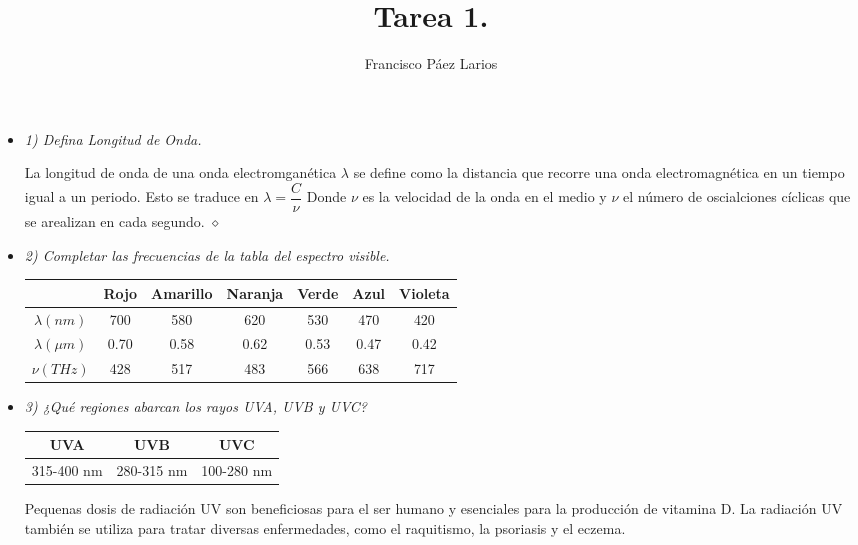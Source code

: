 \documentclass{article}
\title{Tarea 1.}
\author{Francisco Páez Larios}
\begin{document}
\maketitle
\begin{itemize}
\item \textit{1) Defina Longitud de Onda.}

La longitud de onda de una onda electromganética  $ \lambda $ se define como la distancia que recorre una onda electromagnética en un tiempo igual a un periodo. Esto se traduce en $ \lambda =\dfrac{C}{\nu} $ Donde $\nu$ es la velocidad de la onda en el medio y $\nu$  el número de oscialciones cíclicas que se arealizan en cada segundo.
$ \diamond$\\

\item \textit{2) Completar las frecuencias de la tabla del espectro visible.}

\begin{center}
\begin{tabular}{|c|c|c|c|c|c|c|}
\hline 
 & Rojo& Amarillo &Naranja& Verde& Azul& Violeta \\ 
\hline
$ \lambda (nm)$& 700& 580& 620& 530& 470& 420 \\ 
\hline 
$ \lambda(\mu m)$ & 0.70& 0.58& 0.62& 0.53& 0.47& 0.42 \\
\hline
$\nu (THz) $& 428& 517& 483& 566& 638& 717 \\
\hline
\end{tabular}
\end{center}

\item \textit{3) ¿Qué regiones abarcan los rayos UVA, UVB y UVC?}

\begin{center}
\begin{tabular}{|c|c|c|}
\hline
UVA& UVB& UVC \\
\hline
315-400 nm& 280-315 nm & 100-280 nm \\
\hline

\end{tabular}
\end{center}
Pequenas dosis de radiación UV son beneficiosas para el ser humano y esenciales para la producción de vitamina D. La radiación UV también se utiliza para tratar diversas enfermedades, como el raquitismo, la psoriasis y el eczema.





\end{itemize}
\end{document}
